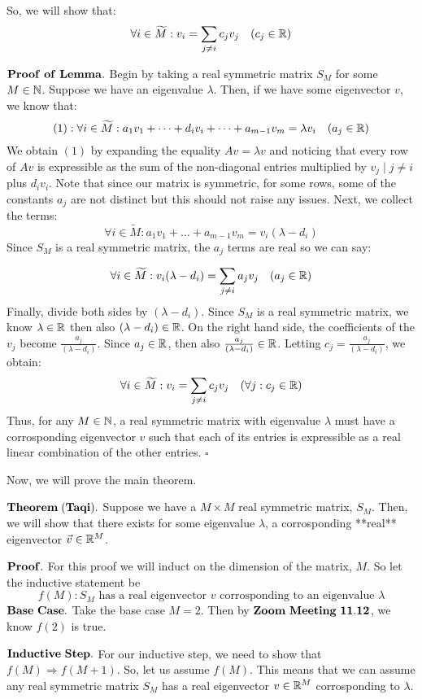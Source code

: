 So, we will show that:
$$\forall i \in \widetilde{M}: v_i =  {\sum_{j \neq i} c_j v_j} \quad (c_j \in \mathbb{R})$$

$\bf Proof \,\,of\,\, Lemma.$ Begin by taking a real symmetric matrix $S_M$ for some $M \in \mathbb{N}$. Suppose we have an eigenvalue $\lambda$. Then, if we have some eigenvector $v$, we know that:
$$(1): \forall i \in \widetilde{M} : a_1v_1 + \dots + d_iv_i + \dots + a_{m-1}v_m = \lambda v_i \quad ( a_j \in \mathbb{R})$$
We obtain $(1)$ by expanding the equality $Av = \lambda v$ and noticing that every row of $Av$ is expressible as the sum of the non-diagonal entries multiplied by $v_j \mid j \neq i$ plus $d_i v_i$. Note that since our matrix is symmetric, for some rows, some of the constants $a_j$ are not distinct but this should not raise any issues. Next, we collect the terms:
$$\forall i \in \widetilde{M} : a_1v_1 + \dots + a_{m-1}v_m =  v_i(\lambda - d_i)$$
Since $S_M$ is a real symmetric matrix, the $a_j$ terms are real so we can say:

$$\forall i \in \widetilde{M} :  v_i(\lambda - d_i) = \sum_{j \neq i} a_jv_j \quad (a_j \in \mathbb{R})$$
Finally, divide both sides by $(\lambda - d_i)$. Since $S_M$ is a real symmetric matrix, we know $\lambda \in \mathbb{R}$ then also $(\lambda - d_i) \in \mathbb{R}$. On the right hand side, the coefficients of the $v_j$ become $\frac{a_j}{(\lambda - d_i)}$. Since $a_j \in \mathbb{R}$, then also $\frac{a_j}{(\lambda - d_i)} \in \mathbb{R}$. Letting $c_j = \frac{a_j}{(\lambda - d_i)}$, we obtain:
$$\forall i \in \widetilde{M}: v_i =  {\sum_{j \neq i} c_j v_j} \quad (\forall j: c_j \in \mathbb{R})$$
Thus, for any $M \in \mathbb{N}$, a real symmetric matrix with eigenvalue $\lambda$ must have a corrosponding eigenvector $v$ such that each of its entries is expressible as a real linear combination of the other entries. $\square$

Now, we will prove the main theorem.

$\bf Theorem \; (Taqi).$ Suppose we have a $M \times M$ real symmetric matrix, $S_M$. Then, we will show that there exists for some eigenvalue $\lambda$, a corrosponding **real** eigenvector $\vec{v} \in \mathbb{R}^M$.

$\bf Proof.$ For this proof we will induct on the dimension of the matrix, $M$. So let the inductive statement be
$$f(M) : S_M\text{ has a real eigenvector } v \text{ corrosponding to an eigenvalue } \lambda$$
$\bf Base \,\, Case.$ Take the base case $M = 2$. Then by $\bf Zoom \,\,Meeting\,\, 11.12$, we know $f(2)$ is true.

$\bf Inductive \,\, Step.$ For our inductive step, we need to show that $f(M) \Rightarrow f(M+1)$. So, let us assume $f(M)$. This means that we can assume any real symmetric matrix $S_M$ has a real eigenvector $v \in \mathbb{R}^M$ corrosponding to $\lambda$.

